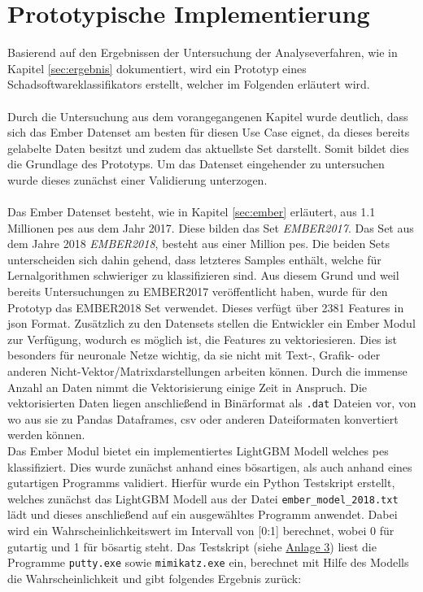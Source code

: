 \documentclass[
    12pt, %
    DIV10,
    ngerman, %
    a4paper, %
    oneside, %
    titlepage, %
    parskip=half, %
    headings=normal, %
    listof=totoc, %
    bibliography=totoc, %
    index=totoc, %
    captions=tableheading, %
    final %
]{scrreprt}
\begin{document}
\chapter{Prototypische Implementierung}
Basierend auf den Ergebnissen der Untersuchung der Analyseverfahren, wie in Kapitel \ref{sec:ergebnis} dokumentiert, wird ein Prototyp eines Schadsoftwareklassifikators erstellt, welcher im Folgenden erläutert wird.\\\\
Durch die Untersuchung aus dem vorangegangenen Kapitel wurde deutlich, dass sich das Ember Datenset am besten für diesen Use Case eignet, da dieses bereits gelabelte Daten besitzt und zudem das aktuellste Set darstellt. Somit bildet dies die Grundlage des Prototyps. Um das Datenset eingehender zu untersuchen wurde dieses zunächst einer Validierung unterzogen.\\\\
Das Ember Datenset besteht, wie in Kapitel \ref{sec:ember} erläutert, aus 1.1 Millionen \ac{pes} aus dem Jahr 2017. Diese bilden das Set \emph{EMBER2017}. Das Set aus dem Jahre 2018 \emph{EMBER2018}, besteht aus einer Million \ac{pes}. Die beiden Sets unterscheiden sich dahin gehend, dass letzteres Samples enthält, welche für Lernalgorithmen schwieriger zu klassifizieren sind. Aus diesem Grund und weil \textcite{anderson2018ember} bereits Untersuchungen zu EMBER2017 veröffentlicht haben, wurde für den Prototyp das EMBER2018 Set
 verwendet. Dieses verfügt über 2381 Features in \ac{json} Format. Zusätzlich zu den Datensets stellen die Entwickler ein Ember Modul zur Verfügung, wodurch es möglich ist, die Features zu vektoriesieren. Dies ist besonders für neuronale Netze wichtig, da sie nicht mit Text-, Grafik- oder anderen Nicht-Vektor/Matrixdarstellungen arbeiten können. Durch die immense Anzahl an Daten nimmt die Vektorisierung einige Zeit in Anspruch. Die vektorisierten Daten liegen anschlie{\ss}end in Binärformat als \texttt{.dat} Dateien vor, von wo aus sie zu Pandas Dataframes, \ac{csv} oder anderen Dateiformaten konvertiert werden können.\\
Das Ember Modul bietet ein implementiertes LightGBM Modell welches \ac{pes} klassifiziert. Dies wurde zunächst anhand eines bösartigen, als auch anhand eines gutartigen Programms validiert.
Hierfür wurde ein Python Testskript erstellt, welches zunächst das LightGBM Modell aus der Datei \texttt{ember\_model\_2018.txt} lädt und dieses anschlie{\ss}end auf ein ausgewähltes Programm anwendet. Dabei wird ein Wahrscheinlichkeitswert im Intervall von [0:1] berechnet, wobei 0 für gutartig und 1 für bösartig steht. Das Testskript (siehe \hyperref[testskript]{Anlage 3}) liest die Programme \texttt{putty.exe} sowie \texttt{mimikatz.exe} ein, berechnet mit Hilfe des Modells die Wahrscheinlichkeit und gibt folgendes Ergebnis zurück:
\end{document}
